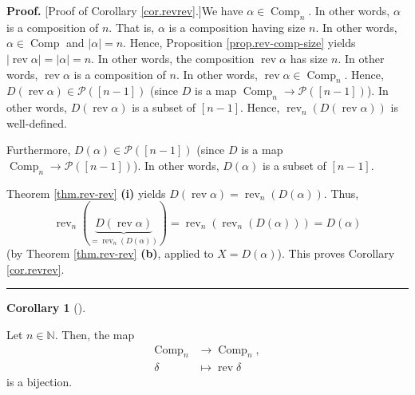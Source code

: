 \documentclass[numbers=enddot,12pt,final,onecolumn,notitlepage]{scrartcl}%
\theoremstyle{definition}
\newtheorem{coro}[theo]{Corollary}
\newenvironment{corollary}[1][]
{\begin{coro}[#1]\begin{leftbar}}
{\end{leftbar}\end{coro}}
\newenvironment{proof}[1][Proof]{\noindent\textbf{#1.} }{\ \rule{0.5em}{0.5em}}
\begin{document}
\begin{proof}
[Proof of Corollary \ref{cor.revrev}.]We have $\alpha\in\operatorname*{Comp}%
\nolimits_{n}$. In other words, $\alpha$ is a composition of $n$. That is,
$\alpha$ is a composition having size $n$. In other words, $\alpha
\in\operatorname*{Comp}$ and $\left\vert \alpha\right\vert =n$. Hence,
Proposition \ref{prop.rev-comp-size} yields $\left\vert \operatorname*{rev}%
\alpha\right\vert =\left\vert \alpha\right\vert =n$. In other words, the
composition $\operatorname*{rev}\alpha$ has size $n$. In other words,
$\operatorname*{rev}\alpha$ is a composition of $n$. In other words,
$\operatorname*{rev}\alpha\in\operatorname*{Comp}\nolimits_{n}$. Hence,
$D\left(  \operatorname*{rev}\alpha\right)  \in\mathcal{P}\left(  \left[
n-1\right]  \right)  $ (since $D$ is a map $\operatorname*{Comp}%
\nolimits_{n}\rightarrow\mathcal{P}\left(  \left[  n-1\right]  \right)  $). In
other words, $D\left(  \operatorname*{rev}\alpha\right)  $ is a subset of
$\left[  n-1\right]  $. Hence, $\operatorname*{rev}\nolimits_{n}\left(
D\left(  \operatorname*{rev}\alpha\right)  \right)  $ is well-defined.

Furthermore, $D\left(  \alpha\right)  \in\mathcal{P}\left(  \left[
n-1\right]  \right)  $ (since $D$ is a map $\operatorname*{Comp}%
\nolimits_{n}\rightarrow\mathcal{P}\left(  \left[  n-1\right]  \right)  $). In
other words, $D\left(  \alpha\right)  $ is a subset of $\left[  n-1\right]  $.

Theorem \ref{thm.rev-rev} \textbf{(i)} yields $D\left(  \operatorname*{rev}%
\alpha\right)  =\operatorname*{rev}\nolimits_{n}\left(  D\left(
\alpha\right)  \right)  $. Thus,%
\[
\operatorname*{rev}\nolimits_{n}\left(  \underbrace{D\left(
\operatorname*{rev}\alpha\right)  }_{=\operatorname*{rev}\nolimits_{n}\left(
D\left(  \alpha\right)  \right)  }\right)  =\operatorname*{rev}\nolimits_{n}%
\left(  \operatorname*{rev}\nolimits_{n}\left(  D\left(  \alpha\right)
\right)  \right)  =D\left(  \alpha\right)
\]
(by Theorem \ref{thm.rev-rev} \textbf{(b)}, applied to $X=D\left(
\alpha\right)  $). This proves Corollary \ref{cor.revrev}.
\end{proof}

\begin{corollary}
\label{cor.rev-bijn}Let $n\in\mathbb{N}$. Then, the map%
\begin{align*}
\operatorname*{Comp}\nolimits_{n} &  \rightarrow\operatorname*{Comp}%
\nolimits_{n},\\
\delta &  \mapsto\operatorname*{rev}\delta
\end{align*}
is a bijection.
\end{corollary}
\end{document}
